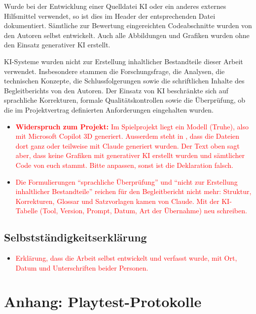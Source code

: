 \documentclass[../Main.tex]{subfiles}
\begin{document}
Wurde bei der Entwicklung einer Quelldatei KI oder ein anderes externes Hilfsmittel verwendet, so ist dies im Header der entsprechenden Datei dokumentiert. Sämtliche zur Bewertung eingereichten Codeabschnitte wurden von den Autoren selbst entwickelt. Auch alle Abbildungen und Grafiken wurden ohne den Einsatz generativer KI erstellt.

KI-Systeme wurden nicht zur Erstellung inhaltlicher Bestandteile dieser Arbeit verwendet. Insbesondere stammen die Forschungsfrage, die Analysen, die technischen Konzepte, die Schlussfolgerungen sowie die schriftlichen Inhalte des Begleitberichts von den Autoren. Der Einsatz von KI beschränkte sich auf sprachliche Korrekturen, formale Qualitätskontrollen sowie die Überprüfung, ob die im Projektvertrag definierten Anforderungen eingehalten wurden.

\begin{itemize}[leftmargin=1.5cm]
    \item \textcolor{red}{\textbf{Widerspruch zum Projekt:} Im Spielprojekt liegt ein Modell  (Truhe), also mit Microsoft Copilot 3D generiert. Ausserdem steht in , dass die Dateien dort ganz oder teilweise mit Claude generiert wurden. Der Text oben sagt aber, dass keine Grafiken mit generativer KI erstellt wurden und sämtlicher Code von euch stammt. Bitte anpassen, sonst ist die Deklaration falsch.}
    \item \textcolor{red}{Die Formulierungen \enquote{sprachliche Überprüfung} und \enquote{nicht zur Erstellung inhaltlicher Bestandteile} reichen für den Begleitbericht nicht mehr: Struktur, Korrekturen, Glossar und Satzvorlagen kamen von Claude. Mit der KI-Tabelle (Tool, Version, Prompt, Datum, Art der Übernahme) neu schreiben.}
\end{itemize}

\subsection{Selbstständigkeitserklärung}

\begin{itemize}[leftmargin=1.5cm]
    \item \textcolor{red}{Erklärung, dass die Arbeit selbst entwickelt und verfasst wurde, mit Ort, Datum und Unterschriften beider Personen.}
\end{itemize}


\newpage
{}
\section{Anhang: Playtest-Protokolle} \label{sec:PlaytestProtokolle}
\end{document}
